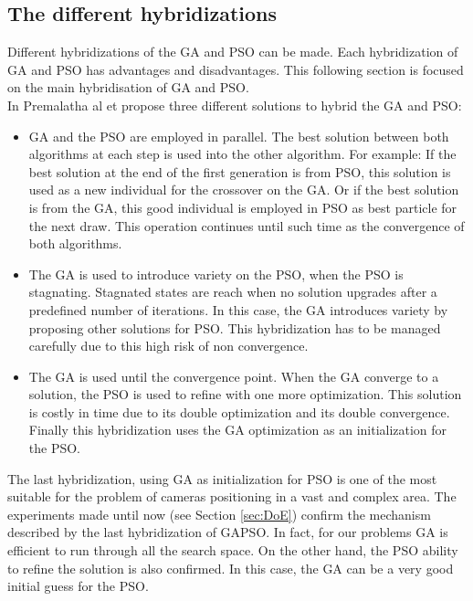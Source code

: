 \subsection{The different hybridizations }

 Different hybridizations of the GA and PSO can be made. Each hybridization of GA and PSO has advantages and disadvantages. This following section is focused on the main hybridisation of GA and PSO. \\
In Premalatha al et \cite{76*premalatha2009}  propose three different solutions to hybrid the GA and PSO: 
\begin{itemize}
\item  GA and the PSO are employed in parallel. The best solution between both algorithms  at each step is used into the other algorithm. 
For example: If the best solution at the end of the first generation is from PSO, this solution is used as a new individual for the crossover on the GA. Or if the best solution is from the GA, this good individual is employed in PSO as best particle for the next draw. This operation continues until such time as the convergence of both algorithms.   
 
\item The GA is used to introduce variety on the PSO, when the PSO is stagnating. Stagnated states are reach when no solution upgrades after a predefined number of iterations. In this case, the GA introduces variety by proposing other solutions for PSO. This hybridization has to be managed carefully due to this high risk of non convergence. 

\item The GA is used until the convergence point. When the GA converge to a solution, the PSO is used to refine with one more optimization. This solution is costly in time due to its double optimization and its double convergence. Finally this hybridization uses the GA optimization as an initialization for the PSO.\\
\end{itemize}

The last hybridization, using GA as initialization for PSO is one of the most suitable for the problem of cameras positioning in a vast and complex area.  
The experiments made until now (see Section \ref{sec:DoE}) confirm the mechanism described by the last hybridization of GAPSO. In fact, for our problems GA is efficient to run through all the search space. On the other hand, the PSO ability  to refine the solution is also confirmed.  
In this case, the GA can be a very good initial guess for the PSO. \\

